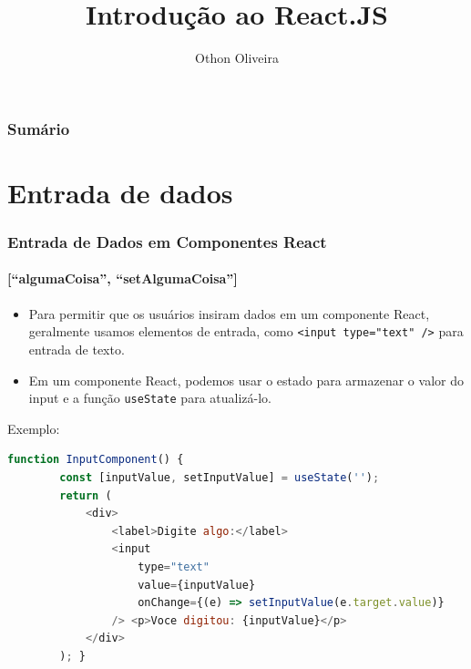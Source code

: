 \documentclass[13pt, xcolor={dvipsnames,svgnames}, portuguese]{beamer}
\author{Othon Oliveira}
\title{Introdução ao React.JS}
\institute{SENAC - PROA}
\date{}
\begin{document}
\begin{frame}
\titlepage
\end{frame}

\newcommand{\capa}{
    \begin{tikzpicture}[remember picture,overlay]
        \node at (current page.south west)
            {\begin{tikzpicture}[remember picture, overlay]
                \fill[shading=radial,top color=orange,bottom color=orange,middle color=yellow] (0,0) rectangle (\paperwidth,\paperheight);
            \end{tikzpicture}
          };
    \end{tikzpicture}
}

\begin{frame}\frametitle{Sumário}
\tableofcontents
\end{frame}


\section{Entrada de dados}
\begin{frame}[fragile]
\frametitle{Entrada de Dados em Componentes React}
\framesubtitle{[``algumaCoisa'', ``setAlgumaCoisa'']}
\begin{itemize}
    \item Para permitir que os usuários insiram dados em um componente React, geralmente usamos elementos de entrada, como \texttt{<input type="text" />} para entrada de texto.
    \item Em um componente React, podemos usar o estado para armazenar o valor do input e a função \texttt{useState} para atualizá-lo.
\end{itemize}
Exemplo:
    \begin{lstlisting}[language=JavaScript]
    function InputComponent() {
        const [inputValue, setInputValue] = useState('');
        return (
            <div>
                <label>Digite algo:</label>
                <input 
                    type="text" 
                    value={inputValue} 
                    onChange={(e) => setInputValue(e.target.value)} 
                /> <p>Voce digitou: {inputValue}</p>
            </div>
        ); }
    \end{lstlisting}

\end{frame}
\end{document}
